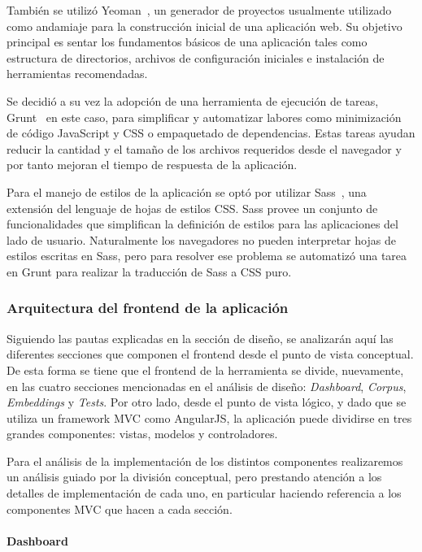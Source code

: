 También se utilizó Yeoman~\cite{Yeoman}, un generador de proyectos usualmente utilizado como andamiaje
para la construcción inicial de una aplicación web. Su objetivo principal es sentar los fundamentos básicos
de una aplicación tales como estructura de directorios, archivos de configuración iniciales e instalación
de herramientas recomendadas.

Se decidió a su vez la adopción de una herramienta de ejecución de tareas, Grunt~\cite{Grunt} en este caso,
para simplificar y automatizar labores como minimización de código JavaScript y CSS o empaquetado de
dependencias. Estas tareas ayudan reducir la cantidad y el tamaño de los archivos requeridos desde el
navegador y por tanto mejoran el tiempo de respuesta de la aplicación.

Para el manejo de estilos de la aplicación se optó por utilizar Sass~\cite{Sass}, una extensión del lenguaje
de hojas de estilos CSS. Sass provee un conjunto de funcionalidades que simplifican la definición de
estilos para las aplicaciones del lado de usuario. Naturalmente los navegadores no pueden interpretar
hojas de estilos escritas en Sass, pero para resolver ese problema se automatizó una tarea en Grunt para
realizar la traducción de Sass a CSS puro.

\subsubsection{Arquitectura del frontend de la aplicación}

Siguiendo las pautas explicadas en la sección de diseño, se analizarán aquí las diferentes secciones que
componen el frontend desde el punto de vista conceptual. De esta forma se tiene que el frontend de la
herramienta se divide, nuevamente, en las cuatro secciones mencionadas en el análisis de diseño:
\textit{Dashboard}, \textit{Corpus}, \textit{Embeddings} y \textit{Tests}. Por otro lado, desde el punto
de vista lógico, y dado que se utiliza un framework MVC como AngularJS, la aplicación puede dividirse en
tres grandes componentes: vistas, modelos y controladores.

Para el análisis de la implementación de los distintos componentes realizaremos un análisis guiado por la
división conceptual, pero prestando atención a los detalles de implementación de cada uno, en
particular haciendo referencia a los componentes MVC que hacen a cada sección.

\paragraph{Dashboard}

